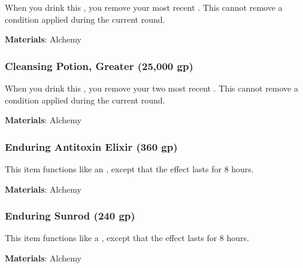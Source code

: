 When you drink this , you remove your most recent .
This cannot remove a condition applied during the current round.



\vspace{0.25em}
\textbf{Materials}: Alchemy


\lowercase{\hypertarget{item:Cleansing Potion, Greater}{}}\label{item:Cleansing Potion, Greater}
\hypertarget{item:Cleansing Potion, Greater}{\subsubsection{Cleansing Potion, Greater\hfill{} (25,000 gp)}}

When you drink this , you remove your two most recent .
This cannot remove a condition applied during the current round.



\vspace{0.25em}
\textbf{Materials}: Alchemy


\lowercase{\hypertarget{item:Enduring Antitoxin Elixir}{}}\label{item:Enduring Antitoxin Elixir}
\hypertarget{item:Enduring Antitoxin Elixir}{\subsubsection{Enduring Antitoxin Elixir\hfill{} (360 gp)}}

This item functions like an , except that the effect lasts for 8 hours.



\vspace{0.25em}
\textbf{Materials}: Alchemy


\lowercase{\hypertarget{item:Enduring Sunrod}{}}\label{item:Enduring Sunrod}
\hypertarget{item:Enduring Sunrod}{\subsubsection{Enduring Sunrod\hfill{} (240 gp)}}

This item functions like a , except that the effect lasts for 8 hours.



\vspace{0.25em}
\textbf{Materials}: Alchemy


